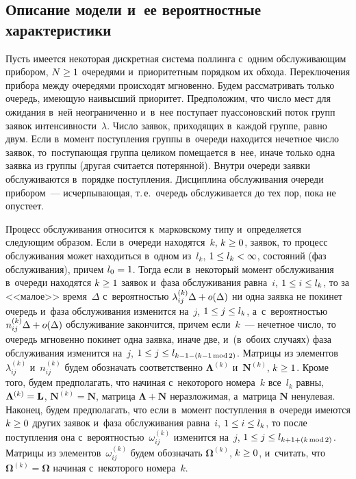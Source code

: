 \begin{multicols}{2}
\section{Описание модели и~ее вероятностные характеристики}


Пусть имеется некоторая дискретная система поллинга с~одним обслуживающим 
прибором, ${N\hm\ge 1}$ очередями и~приоритетным порядком их обхода.
Переключения прибора между очередями происходят мгновенно.
Будем рассматривать только очередь, имеющую наивысший приоритет. Предположим, 
что число мест для ожидания в~ней неограниченно
и~в~нее поступает пуассоновский поток групп заявок интенсивности~$\lambda$.
Число заявок, приходящих в~каждой группе, равно двум.
Если в~момент поступления группы в~очереди находится нечетное число заявок,
то~поступающая группа целиком помещается в~нее, иначе только одна заявка из группы (другая считается потерянной).
Внутри очереди заявки обслуживаются в~порядке поступления.
Дисциплина обслуживания очереди прибором~--- исчерпывающая,
т.\,е.\ очередь обслуживается до тех пор, пока не опустеет.

Процесс обслуживания относится к~марковскому типу и~определяется следующим 
образом. Если в~очереди находятся~$k$, ${k\hm\ge 0}$, заявок, то процесс обслуживания
может находиться в~одном из~$l_k$, ${1 \hm\le l_k\hm<\infty}$, состояний (фаз 
обслуживания), причем ${l_0\hm=1}$.
Тогда если в~некоторый момент обслуживания в~очереди
находятся ${k\hm\ge 1}$ заявок и~фаза обслуживания
равна~$i$, ${1\hm\le i \hm\le l_k}$, то за <<малое>> время~$\Delta$ с~вероятностью
${\lambda_{ij}^{(k)} \Delta \hm+ o(\Delta)}$ ни одна заявка не покинет очередь
и~фаза обслуживания изменится на~$j$, ${1\hm \le j \hm\le l_{k}}$,
а~с~ве\-ро\-ят\-ностью ${n_{ij}^{(k)} \Delta \hm+ o(\Delta)}$
обслуживание закончится,
причем если~$k$~--- нечетное число, то очередь мгновенно покинет
одна заявка, иначе две, и~(в~обоих случаях) фаза обслуживания изменится
на~$j$, ${1 \hm\le j \hm\le l_{k-1-(k-1\,\mathrm{mod}\,2)}}$.
Матрицы из элементов $\lambda_{ij}^{(k)}$ и~${n_{ij}^{(k)}}$
будем обозначать соответственно ${\bm{\Lambda}}^{(k)}$ и~${\mathbf{N}}^{(k)}$, ${k \hm\ge 1}$.
Кроме того, будем предполагать, что начиная с~некоторого номера~$k$ все~$l_k$ равны, 
${{\bm{\Lambda}}^{(k)}\hm={\mathbf{L}}}$, ${{\mathbf{N}}^{(k)}={\mathbf{N}}}$, мат\-ри\-ца 
${{\bm{\Lambda}}+ {\mathbf{N}}}$ неразложимая, а~ма\-тр\-ица ${\mathbf{N}}$ ненулевая.
Наконец, будем предполагать, что если в~момент поступления в~очереди
имеются ${k \hm\ge 0}$ других заявок и~фаза обслуживания равна~$i$, ${1\hm \le i \hm\le  l_k}$, то
после поступления она с~вероятностью~$\omega_{ij}^{(k)}$
изменится на~$j$, ${1 \hm\le j \hm\le l_{k+1+(k\,\mathrm{mod}\,2)}}$.
Матрицы из элементов~$\omega_{ij}^{(k)}$ будем обозначать ${\bm{\Omega}}^{(k)}$, 
${k \hm\ge 0}$,
и~считать, что ${{\bm{\Omega}}^{(k)}={\bm{\Omega}}}$ начиная с~некоторого  номера~$k$.



\end{multicols}
